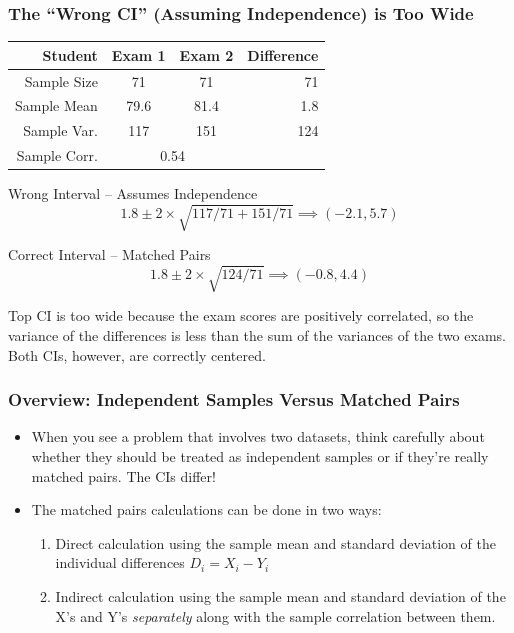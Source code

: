 \begin{frame}
\frametitle{The ``Wrong CI'' (Assuming Independence) is Too Wide}
\footnotesize
%
\begin{table}[!tbp]
\begin{center}
\begin{tabular}{rccr}
\hline\hline
\multicolumn{1}{r}{Student}&\multicolumn{1}{c}{Exam 1}&\multicolumn{1}{c}{Exam 2}&\multicolumn{1}{r}{Difference}\tabularnewline
\hline
Sample Size & 71 & 71 & 71\\
Sample Mean & 79.6 & 81.4  &1.8\\
Sample Var. &117  & 151 & 124\\
Sample Corr.& \multicolumn{2}{c}{0.54}&\\
\hline
\end{tabular}
\end{center}
\end{table}

\singlespacing
\small

\begin{block}{Wrong Interval -- Assumes Independence}
$$1.8 \pm 2\times  \sqrt{117/71 + 151/71} \implies (-2.1, 5.7)$$
\end{block}

\pause

\begin{block}{Correct Interval -- Matched Pairs}
$$1.8 \pm 2\times  \sqrt{124/71} \implies (-0.8, 4.4)$$
\end{block}

\pause
\alert{Top CI is too wide because the exam scores are positively correlated, so the variance of the differences is less than the sum of the variances of the two exams. Both CIs, however, are correctly centered.}

\end{frame}


\begin{frame}
\frametitle{Overview: Independent Samples Versus Matched Pairs}

\begin{itemize}
	\item When you see a problem that involves two datasets, think carefully about whether they should be treated as independent samples or if they're really matched pairs. The CIs differ! 
	\item The matched pairs calculations can be done in two ways: 
		\begin{enumerate}
			\item Direct calculation using the sample mean and standard deviation of the individual differences $D_i = X_i - Y_i$ 
			\item Indirect calculation using the sample mean and standard deviation of the X's and Y's \emph{separately} along with the sample correlation between them. 
		\end{enumerate}
\end{itemize}
\end{frame}


